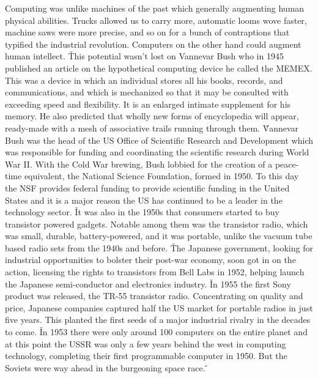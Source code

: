 Computing was unlike machines of the past which generally augmenting human physical abilities. Trucks allowed us to
carry more, automatic looms wove faster, machine saws were more precise, and so on for a bunch of contraptions that
typified the industrial revolution. Computers on the other hand could augment human intellect. \v

This potential wasn't lost on Vannevar Bush who in 1945 published an article on the hypothetical computing device he
called the MEMEX. This was a device in which an individual stores all his books, records, and communications, and
which is mechanized so that it may be consulted with exceeding speed and flexibility. It is an enlarged intimate
supplement for his memory. He also predicted that wholly new forms of encyclopedia will appear, ready-made with a
mesh of associative trails running through them. \v

Vannevar Bush was the head of the US Office of Scientific Research and Development which was responsible for funding
and coordinating the scientific research during World War II. With the Cold War brewing, Bush lobbied for the
creation of a peace-time equivalent, the National Science Foundation, formed in 1950. To this day the NSF provides
federal funding to provide scientific funding in the United States and it is a major reason the US has continued to
be a leader in the technology sector. \v

It was also in the 1950s that consumers started to buy transistor powered gadgets. Notable among them was the
transistor radio, which was small, durable, battery-powered, and it was portable, unlike the vacuum tube based radio
sets from the 1940s and before. \v

The Japanese government, looking for industrial opportunities to bolster their post-war economy, soon got in on the
action, licensing the rights to transistors from Bell Labs in 1952, helping launch the Japanese semi-conductor and
electronics industry. \v

In 1955 the first Sony product was released, the TR-55 transistor radio. Concentrating on quality and price, Japanese
companies captured half the US market for portable radios in just five years. This planted the first seeds of a major
industrial rivalry in the decades to come. \v

In 1953 there were only around 100 computers on the entire planet and at this point the USSR was only a few years
behind the west in computing technology, completing their first programmable computer in 1950. But the Soviets were
way ahead in the burgeoning space race. \v

